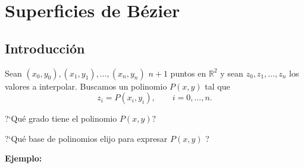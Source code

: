 \documentclass[twoside]{report}
\newcommand{\colocapdf}[2]{\quad\pdfimage width #2 {pdfs/#1.pdf}}
\begin{document}
%
%
%
%
%
%
%
%
%

\section{Superficies de B\'{e}zier}

\subsection{Introducción}

Sean $(x_0,y_0),(x_1,y_1), \ldots,(x_n,y_n)$  \quad $n+1$ puntos en $\mathbb{R}^2$ y sean $z_0,z_1,\ldots,z_n$ los valores a interpolar. Buscamos un polinomio $P(x,y)$ tal que
$$z_i=P(x_i,y_i), \quad \quad i=0,\ldots,n.$$

?`Qu\'{e} grado tiene el polinomio $P(x,y)$?

?`Qu\'{e} base de polinomios elijo para expresar $P(x,y)$ ?

{\bf Ejemplo:}
\end{document}
